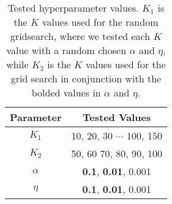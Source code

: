 \begin{table}[h]
	\centering
	\caption{Tested hyperparameter values. $K_1$ is the $K$ values used for the random gridsearch, where we tested each $K$ value with a random chosen $\alpha$ and $\eta$, while $K_2$ is the $K$ values used for the grid search in conjunction with the bolded values in $\alpha$ and $\eta$.}
	\begin{tabular}{c|c}
		Parameter & Tested Values\\
		\midrule
		$K_1$ & 10, 20, 30 $\cdots$ 100, 150\\
		$K_2$ & 50, 60 70, 80, 90, 100\\
		$\alpha$ & \textbf{0.1}, \textbf{0.01}, 0.001\\
		$\eta$ & \textbf{0.1}, \textbf{0.01}, 0.001\\
	\end{tabular}
	\label{tab:gridsearch}
\end{table}
